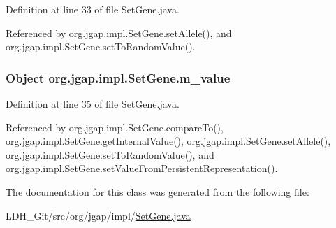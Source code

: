 Definition at line 33 of file Set\-Gene.\-java.



Referenced by org.\-jgap.\-impl.\-Set\-Gene.\-set\-Allele(), and org.\-jgap.\-impl.\-Set\-Gene.\-set\-To\-Random\-Value().

\hypertarget{classorg_1_1jgap_1_1impl_1_1_set_gene_ab52e4cd13d842dab78b1d8668a2853ff}{
\subsubsection[{m\-\_\-value}]{\setlength{\rightskip}{0pt plus 5cm}Object org.\-jgap.\-impl.\-Set\-Gene.\-m\-\_\-value\hspace{0.3cm}{\ttfamily [private]}}}\label{classorg_1_1jgap_1_1impl_1_1_set_gene_ab52e4cd13d842dab78b1d8668a2853ff}


Definition at line 35 of file Set\-Gene.\-java.



Referenced by org.\-jgap.\-impl.\-Set\-Gene.\-compare\-To(), org.\-jgap.\-impl.\-Set\-Gene.\-get\-Internal\-Value(), org.\-jgap.\-impl.\-Set\-Gene.\-set\-Allele(), org.\-jgap.\-impl.\-Set\-Gene.\-set\-To\-Random\-Value(), and org.\-jgap.\-impl.\-Set\-Gene.\-set\-Value\-From\-Persistent\-Representation().



The documentation for this class was generated from the following file\-:\begin{DoxyCompactItemize}
\item 
L\-D\-H\-\_\-\-Git/src/org/jgap/impl/\hyperlink{_set_gene_8java}{Set\-Gene.\-java}\end{DoxyCompactItemize}
